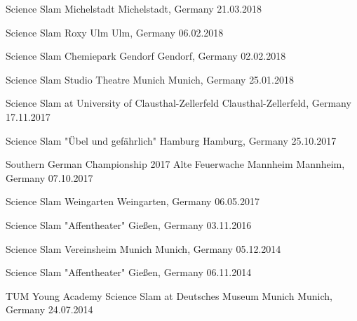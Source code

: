 \begin{cvhonors}
\cvhonor
{Science Slam Michelstadt} %
{Michelstadt, Germany} %
{} %
{21.03.2018} %

\cvhonor
{Science Slam Roxy Ulm} %
{Ulm, Germany} %
{} %
{06.02.2018} %

\cvhonor
{Science Slam Chemiepark Gendorf} %
{Gendorf, Germany} %
{} %
{02.02.2018} %

\cvhonor
{Science Slam Studio Theatre Munich} %
{Munich, Germany} %
{} %
{25.01.2018} %

\cvhonor
{Science Slam at University of Clausthal-Zellerfeld} %
{Clausthal-Zellerfeld, Germany} %
{} %
{17.11.2017} %

\cvhonor
{Science Slam "Übel und gefährlich" Hamburg} %
{Hamburg, Germany} %
{} %
{25.10.2017} %

\cvhonor
{Southern German Championship 2017 Alte Feuerwache Mannheim} %
{Mannheim, Germany} %
{} %
{07.10.2017} %

\cvhonor
{Science Slam Weingarten} %
{Weingarten, Germany} %
{} %
{06.05.2017} %

\cvhonor
{Science Slam "Affentheater"} %
{Gießen, Germany} %
{} %
{03.11.2016} %

\cvhonor
{Science Slam Vereinsheim Munich} %
{Munich, Germany} %
{} %
{05.12.2014} %

\cvhonor
{Science Slam "Affentheater"} %
{Gießen, Germany} %
{} %
{06.11.2014} %

\cvhonor
{TUM Young Academy Science Slam at Deutsches Museum Munich} %
{Munich, Germany} %
{} %
{24.07.2014} %

\end{cvhonors}


